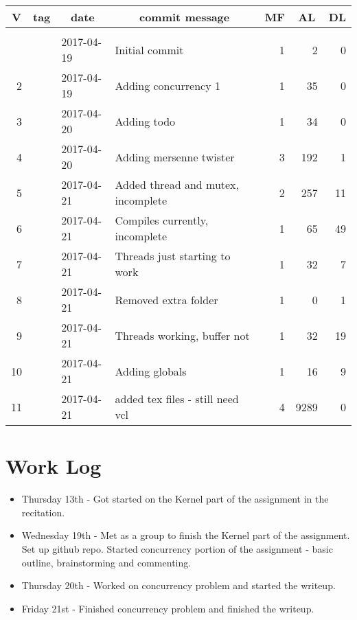 \documentclass[letterpaper,10pt,titlepage, onecolumn, compsoc]{IEEEtran}
\begin{document}
\begin{longtable}{|rlllrrr|}
\hline \multicolumn{1}{|c}{\textbf{V}} & \multicolumn{1}{c}{\textbf{tag}}
& \multicolumn{1}{c}{\textbf{date}}
& \multicolumn{1}{c}{\textbf{commit message}} & \multicolumn{1}{c}{\textbf{MF}}
& \multicolumn{1}{c}{\textbf{AL}} & \multicolumn{1}{c|}{\textbf{DL}} \\ \hline
\endhead

\hline \multicolumn{7}{|r|}{} \\ \hline
\endfoot

\hline%
\endlastfoot

\hline 1 &  & 2017-04-19 & Initial commit & 1 & 2 & 0 \\
\hline 2 &  & 2017-04-19 & Adding concurrency 1 & 1 & 35 & 0 \\
\hline 3 &  & 2017-04-20 & Adding todo & 1 & 34 & 0 \\
\hline 4 &  & 2017-04-20 & Adding mersenne twister & 3 & 192 & 1 \\
\hline 5 &  & 2017-04-21 & Added thread and mutex, incomplete & 2 & 257 & 11 \\
\hline 6 &  & 2017-04-21 & Compiles currently, incomplete & 1 & 65 & 49 \\
\hline 7 &  & 2017-04-21 & Threads just starting to work & 1 & 32 & 7 \\
\hline 8 &  & 2017-04-21 & Removed extra folder & 1 & 0 & 1 \\
\hline 9 &  & 2017-04-21 & Threads working, buffer not & 1 & 32 & 19 \\
\hline 10 &  & 2017-04-21 & Adding globals & 1 & 16 & 9 \\
\hline 11 &  & 2017-04-21 & added tex files - still need vcl & 4 & 9289 & 0 \\
\end{longtable}


\section{Work Log}
\begin{itemize}
\item Thursday 13th - Got started on the Kernel part of the assignment in the recitation.
\item Wednesday 19th - Met as a group to finish the Kernel part of the assignment. Set up github repo. Started concurrency portion of the assignment - basic outline, brainstorming and commenting.
\item Thursday 20th - Worked on concurrency problem and started the writeup. 
\item Friday 21st - Finished concurrency problem and finished the writeup.
\end{itemize}
\end{document}
